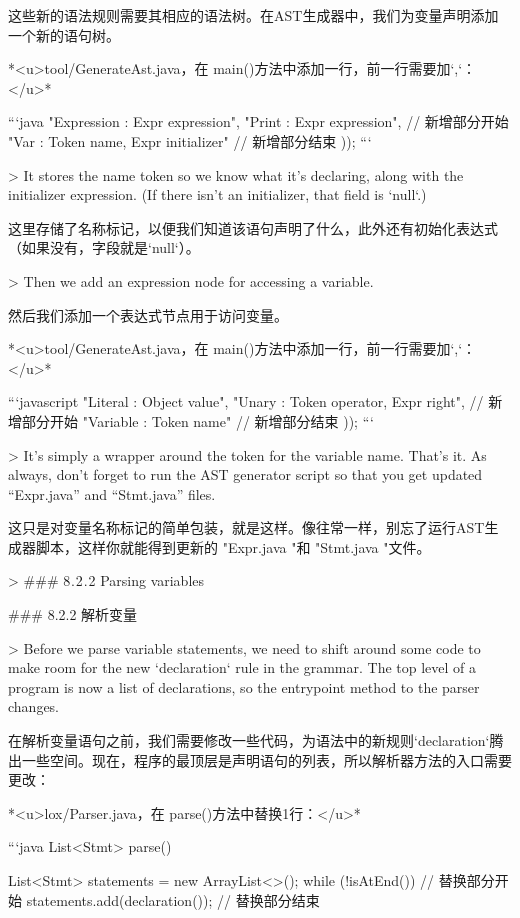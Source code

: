 \documentclass[cn,11pt,chinese]{elegantbook}
\begin{document}
{{{这些新的语法规则需要其相应的语法树。在AST生成器中，我们为变量声明添加一个新的语句树。

*<u>tool/GenerateAst.java，在 main()方法中添加一行，前一行需要加`,`：</u>*

```java
      "Expression : Expr expression",
      "Print      : Expr expression",
      // 新增部分开始
      "Var        : Token name, Expr initializer"
      // 新增部分结束
    ));
```

> It stores the name token so we know what it’s declaring, along with the initializer expression. (If there isn’t an initializer, that field is `null`.)

这里存储了名称标记，以便我们知道该语句声明了什么，此外还有初始化表达式（如果没有，字段就是`null`）。

> Then we add an expression node for accessing a variable.

然后我们添加一个表达式节点用于访问变量。

*<u>tool/GenerateAst.java，在 main()方法中添加一行，前一行需要加`,`：</u>*

```javascript
      "Literal  : Object value",
      "Unary    : Token operator, Expr right",
      // 新增部分开始
      "Variable : Token name"
      // 新增部分结束
    ));
```

> It’s simply a wrapper around the token for the variable name. That’s it. As always, don’t forget to run the AST generator script so that you get updated “Expr.java” and “Stmt.java” files.

这只是对变量名称标记的简单包装，就是这样。像往常一样，别忘了运行AST生成器脚本，这样你就能得到更新的 "Expr.java "和 "Stmt.java "文件。

> ### 8 . 2 . 2 Parsing variables

### 8.2.2 解析变量

> Before we parse variable statements, we need to shift around some code to make room for the new `declaration` rule in the grammar. The top level of a program is now a list of declarations, so the entrypoint method to the parser changes.

在解析变量语句之前，我们需要修改一些代码，为语法中的新规则`declaration`腾出一些空间。现在，程序的最顶层是声明语句的列表，所以解析器方法的入口需要更改：

*<u>lox/Parser.java，在 parse()方法中替换1行：</u>*

```java
    List<Stmt> parse() {
    List<Stmt> statements = new ArrayList<>();
    while (!isAtEnd()) {  
      // 替换部分开始
      statements.add(declaration());
      // 替换部分结束
    }

}}}}
\end{document}
